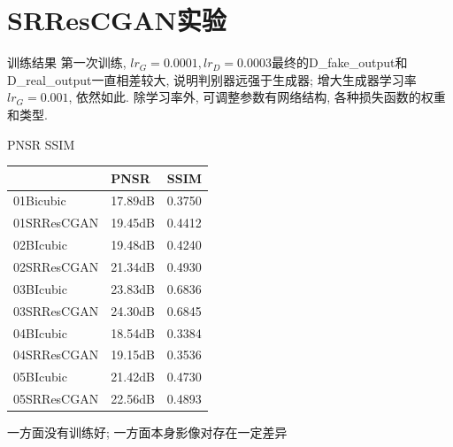 \section{SRResCGAN实验}

\begin{frame}{训练结果}
    第一次训练, $lr_{G}=0.0001, lr_{D}=0.0003$最终的D\_fake\_output和D\_real\_output一直相差较大, 说明判别器远强于生成器; 增大生成器学习率$lr_{G}=0.001$, 依然如此. 除学习率外, 可调整参数有网络结构, 各种损失函数的权重和类型. 
\end{frame}

\begin{frame}{PNSR SSIM}
    \footnotesize
    \begin{tabular}{l|p{3cm}|p{3cm}}
        \hline
                 & PNSR & SSIM     \\ \hline
        01Bicubic & 17.89dB & 0.3750 \\ \hline
        01SRResCGAN & 19.45dB & 0.4412 \\ \hline
        02BIcubic &  19.48dB & 0.4240 \\ \hline
        02SRResCGAN & 21.34dB & 0.4930 \\ \hline
        03BIcubic &  23.83dB & 0.6836 \\ \hline
        03SRResCGAN & 24.30dB & 0.6845 \\ \hline
        04BIcubic &  18.54dB & 0.3384 \\ \hline
        04SRResCGAN & 19.15dB & 0.3536 \\ \hline
        05BIcubic &  21.42dB & 0.4730 \\ \hline
        05SRResCGAN & 22.56dB & 0.4893 \\ \hline
    \end{tabular}

    一方面没有训练好; 一方面本身影像对存在一定差异
\end{frame}

